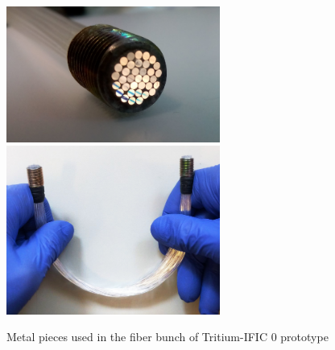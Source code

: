 \begin{figure}[htbp]
\centering
{\includegraphics[width=70mm]{./Figuras/Metalic_piece_bunch_fibers.png}}\hspace{10mm}
{\includegraphics[width=70mm]{./Figuras/bunch_fibers.png}}
\caption{Metal pieces used in the fiber bunch of Tritium-IFIC 0 prototype} \label{fig:Metalic_piece_bunch}
\end{figure}
